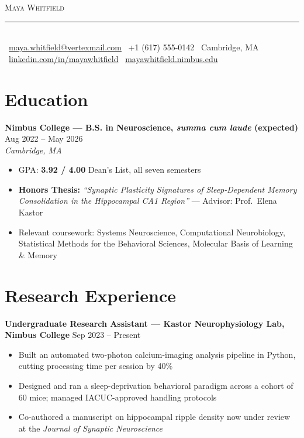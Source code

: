 \documentclass[10pt,a4paper]{article}
\newcommand{\entryhead}[3]{%
  \textbf{#1} \hfill {\color{softgray}\small #2}\\[0.05em]
  {\itshape\color{accentmaroon} #3}\par
}
\begin{document}
\begin{center}
  {\fontsize{23}{25}\selectfont\scshape\color{inkblue} Maya Whitfield}\\[0.2em]
  {\color{accentmaroon}\rule{5.5cm}{0.6pt}}\\[0.2em]
  {\small\color{softgray}
    \faEnvelope\ \href{mailto:maya.whitfield@vertexmail.com}{maya.whitfield@vertexmail.com} \quad
    \faPhone\ +1 (617) 555-0142 \quad
    \faMapMarker\ Cambridge, MA \quad
    \faLinkedin\ \href{https://linkedin.com/in/mayawhitfield}{linkedin.com/in/mayawhitfield} \quad
    \faGlobe\ \href{https://mayawhitfield.nimbus.edu}{mayawhitfield.nimbus.edu}
  }
\end{center}

\vspace{0.2em}

\section*{Education}
\entryhead{Nimbus College --- B.S. in Neuroscience, \textit{summa cum laude} (expected)}{Aug 2022 -- May 2026}{Cambridge, MA}
\begin{itemize}
  \item GPA: \textbf{3.92 / 4.00} \quad\textbar\quad Dean's List, all seven semesters
  \item \textbf{Honors Thesis:} \textit{``Synaptic Plasticity Signatures of Sleep-Dependent Memory Consolidation in the Hippocampal CA1 Region''} --- Advisor: Prof.\ Elena Kastor
  \item Relevant coursework: Systems Neuroscience, Computational Neurobiology, Statistical Methods for the Behavioral Sciences, Molecular Basis of Learning \& Memory
\end{itemize}

\section*{Research Experience}

\entryhead{Undergraduate Research Assistant --- Kastor Neurophysiology Lab, Nimbus College}{Sep 2023 -- Present}{}
\begin{itemize}
  \item Built an automated two-photon calcium-imaging analysis pipeline in Python, cutting processing time per session by 40\%
  \item Designed and ran a sleep-deprivation behavioral paradigm across a cohort of 60 mice; managed IACUC-approved handling protocols
  \item Co-authored a manuscript on hippocampal ripple density now under review at the \textit{Journal of Synaptic Neuroscience}
\end{itemize}
\end{document}
